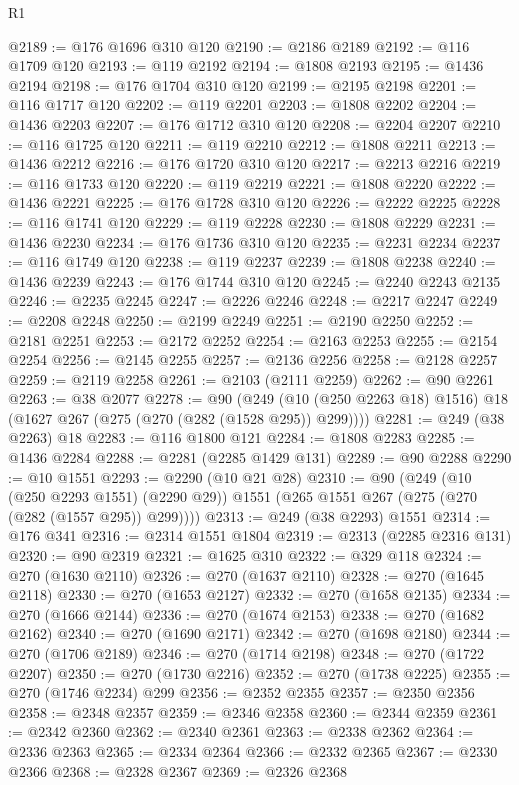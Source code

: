 \begin{lexlean}{R1}
\begin{coremodule}
@2189 := @176 @1696 @310 @120
@2190 := @2186 @2189
@2192 := @116 @1709 @120
@2193 := @119 @2192
@2194 := @1808 @2193
@2195 := @1436 @2194
@2198 := @176 @1704 @310 @120
@2199 := @2195 @2198
@2201 := @116 @1717 @120
@2202 := @119 @2201
@2203 := @1808 @2202
@2204 := @1436 @2203
@2207 := @176 @1712 @310 @120
@2208 := @2204 @2207
@2210 := @116 @1725 @120
@2211 := @119 @2210
@2212 := @1808 @2211
@2213 := @1436 @2212
@2216 := @176 @1720 @310 @120
@2217 := @2213 @2216
@2219 := @116 @1733 @120
@2220 := @119 @2219
@2221 := @1808 @2220
@2222 := @1436 @2221
@2225 := @176 @1728 @310 @120
@2226 := @2222 @2225
@2228 := @116 @1741 @120
@2229 := @119 @2228
@2230 := @1808 @2229
@2231 := @1436 @2230
@2234 := @176 @1736 @310 @120
@2235 := @2231 @2234
@2237 := @116 @1749 @120
@2238 := @119 @2237
@2239 := @1808 @2238
@2240 := @1436 @2239
@2243 := @176 @1744 @310 @120
@2245 := @2240 @2243 @2135
@2246 := @2235 @2245
@2247 := @2226 @2246
@2248 := @2217 @2247
@2249 := @2208 @2248
@2250 := @2199 @2249
@2251 := @2190 @2250
@2252 := @2181 @2251
@2253 := @2172 @2252
@2254 := @2163 @2253
@2255 := @2154 @2254
@2256 := @2145 @2255
@2257 := @2136 @2256
@2258 := @2128 @2257
@2259 := @2119 @2258
@2261 := @2103 (@2111 @2259)
@2262 := @90 @2261
@2263 := @38 @2077
@2278 := @90
    (@249 (@10 (@250 @2263 @18) @1516) @18 (@1627 @267 (@275 (@270 (@282 (@1528 @295)) @299))))
@2281 := @249 (@38 @2263) @18
@2283 := @116 @1800 @121
@2284 := @1808 @2283
@2285 := @1436 @2284
@2288 := @2281 (@2285 @1429 @131)
@2289 := @90 @2288
@2290 := @10 @1551
@2293 := @2290 (@10 @21 @28)
@2310 := @90
    (@249
      (@10 (@250 @2293 @1551) (@2290 @29))
      @1551
      (@265 @1551 @267 (@275 (@270 (@282 (@1557 @295)) @299))))
@2313 := @249 (@38 @2293) @1551
@2314 := @176 @341
@2316 := @2314 @1551 @1804
@2319 := @2313 (@2285 @2316 @131)
@2320 := @90 @2319
@2321 := @1625 @310
@2322 := @329 @118
@2324 := @270 (@1630 @2110)
@2326 := @270 (@1637 @2110)
@2328 := @270 (@1645 @2118)
@2330 := @270 (@1653 @2127)
@2332 := @270 (@1658 @2135)
@2334 := @270 (@1666 @2144)
@2336 := @270 (@1674 @2153)
@2338 := @270 (@1682 @2162)
@2340 := @270 (@1690 @2171)
@2342 := @270 (@1698 @2180)
@2344 := @270 (@1706 @2189)
@2346 := @270 (@1714 @2198)
@2348 := @270 (@1722 @2207)
@2350 := @270 (@1730 @2216)
@2352 := @270 (@1738 @2225)
@2355 := @270 (@1746 @2234) @299
@2356 := @2352 @2355
@2357 := @2350 @2356
@2358 := @2348 @2357
@2359 := @2346 @2358
@2360 := @2344 @2359
@2361 := @2342 @2360
@2362 := @2340 @2361
@2363 := @2338 @2362
@2364 := @2336 @2363
@2365 := @2334 @2364
@2366 := @2332 @2365
@2367 := @2330 @2366
@2368 := @2328 @2367
@2369 := @2326 @2368

\end{coremodule}
\end{lexlean}
